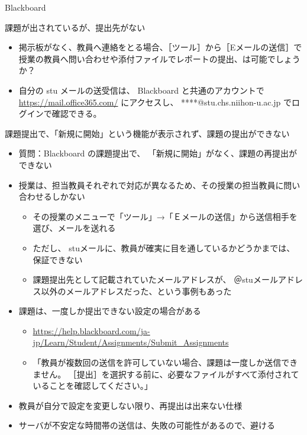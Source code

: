 \documentclass[a4j,10pt]{jsarticle}
\begin{document}
{\begin{frame}[label={sec:org166405d},fragile]{Blackboard}
\begin{block}{課題が出されているが、提出先がない}
\begin{itemize}
\begin{itemize}
\item 掲示板がなく、教員へ連絡をとる場合、［ツール］から［Eメールの送信］で授業の教員へ問い合わせや添付ファイルでレポートの提出、は可能でしょうか？
\item 自分の stu メールの送受信は、 Blackboard と共通のアカウントで
\url{https://mail.office365.com/}
にアクセスし、 ****@stu.chs.niihon-u.ac.jp でログインで確認できる。
\end{itemize}
\end{itemize}
\end{block}
\par
\begin{block}{課題提出で、「新規に開始」という機能が表示されず、課題の提出ができない}
\begin{itemize}
\item 質問：Blackboard の課題提出で、 「新規に開始」がなく、課題の再提出ができない
\par
\item 授業は、担当教員それぞれで対応が異なるため、その授業の担当教員に問い合わせるしかない
\begin{itemize}
\item その授業のメニューで「ツール」→「Ｅメールの送信」から送信相手を選び、メールを送れる
\item ただし、 stuメールに、教員が確実に目を通しているかどうかまでは、保証できない
\item 課題提出先として記載されていたメールアドレスが、 ＠stuメールアドレス以外のメールアドレスだった、という事例もあった
\end{itemize}
\end{itemize}
\par
\begin{itemize}
\item 課題は、一度しか提出できない設定の場合がある
\begin{itemize}
\item \url{https://help.blackboard.com/ja-jp/Learn/Student/Assignments/Submit\_Assignments}
\item 「教員が複数回の送信を許可していない場合、課題は一度しか送信できません。 ［提出］を選択する前に、必要なファイルがすべて添付されていることを確認してください。」
\end{itemize}
\par
\item 教員が自分で設定を変更しない限り、再提出は出来ない仕様
\item サーバが不安定な時間帯の送信は、失敗の可能性があるので、避ける
\end{itemize}

\end{block}
\end{frame}}
\end{document}
